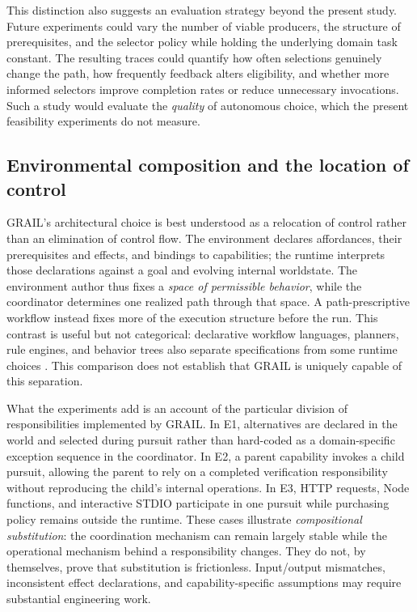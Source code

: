 \documentclass[11pt]{article}
\begin{document}
This distinction also suggests an evaluation strategy beyond the present study. Future experiments could vary the number of viable producers, the structure of prerequisites, and the selector policy while holding the underlying domain task constant. The resulting traces could quantify how often selections genuinely change the path, how frequently feedback alters eligibility, and whether more informed selectors improve completion rates or reduce unnecessary invocations. Such a study would evaluate the \emph{quality} of autonomous choice, which the present feasibility experiments do not measure.

\subsection{Environmental composition and the location of control}
GRAIL's architectural choice is best understood as a relocation of control rather than an elimination of control flow. The environment declares affordances, their prerequisites and effects, and bindings to capabilities; the runtime interprets those declarations against a goal and evolving internal worldstate. The environment author thus fixes a \emph{space of permissible behavior}, while the coordinator determines one realized path through that space. A path-prescriptive workflow instead fixes more of the execution structure before the run. This contrast is useful but not categorical: declarative workflow languages, planners, rule engines, and behavior trees also separate specifications from some runtime choices \cite{Aalst2003,FikesNilsson1971,Colledanchise2018}. This comparison does not establish that GRAIL is uniquely capable of this separation.

What the experiments add is an account of the particular division of responsibilities implemented by GRAIL. In E1, alternatives are declared in the world and selected during pursuit rather than hard-coded as a domain-specific exception sequence in the coordinator. In E2, a parent capability invokes a child pursuit, allowing the parent to rely on a completed verification responsibility without reproducing the child's internal operations. In E3, HTTP requests, Node functions, and interactive STDIO participate in one pursuit while purchasing policy remains outside the runtime. These cases illustrate \emph{compositional substitution}: the coordination mechanism can remain largely stable while the operational mechanism behind a responsibility changes. They do not, by themselves, prove that substitution is frictionless. Input/output mismatches, inconsistent effect declarations, and capability-specific assumptions may require substantial engineering work.
\end{document}
